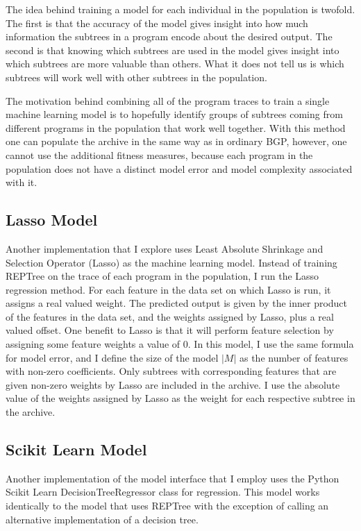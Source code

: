 The idea behind training a model for each individual in the population is twofold.  The first is that the accuracy of the model gives insight into how much information the subtrees in a program encode about the desired output. The second is that knowing which subtrees are used in the model gives insight into which subtrees are more valuable than others.  What it does not tell us is which subtrees will work well with other subtrees in the population.

The motivation behind combining all of the program traces to train a single machine learning model is to hopefully identify groups of subtrees coming from different programs in the population that work well together.  With this method one can populate the archive in the same way as in ordinary BGP, however, one cannot use the additional fitness measures, because each program in the population does not have a distinct model error and model complexity associated with it.

\subsection{Lasso Model}
Another implementation that I explore uses Least Absolute Shrinkage and Selection Operator (Lasso) as the machine learning model.  Instead of training REPTree on the trace of each program in the population, I run the Lasso regression method.  For each feature in the data set on which Lasso is run, it assigns a real valued weight.  The predicted output is given by the inner product of the features in the data set, and the weights assigned by Lasso, plus a real valued offset.  One benefit to Lasso is that it will perform feature selection by assigning some feature weights a value of 0.  In this model, I use the same formula for model error, and I define the size of the model $|M|$ as the number of features with non-zero coefficients.  Only subtrees with corresponding features that are given non-zero weights by Lasso are included in the archive.  I use the absolute value of the weights assigned by Lasso as the weight for each respective subtree in the archive.

\subsection{Scikit Learn Model}
Another implementation of the model interface that I employ uses the Python Scikit Learn DecisionTreeRegressor class for regression.  This model works identically to the model that uses REPTree with the exception of calling an alternative implementation of a decision tree.

